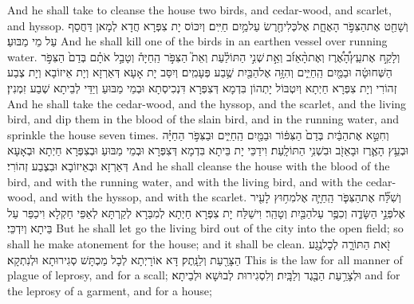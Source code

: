 {And he shall take to cleanse the house two birds, and cedar-wood, and scarlet, and hyssop.}{}
{וְשָׁחַ֖ט אֶת\maqqaf הַצִּפֹּ֣ר הָאֶחָ֑ת אֶל\maqqaf כְּלִי\maqqaf חֶ֖רֶשׂ עַל\maqqaf מַ֥יִם חַיִּֽים׃}
{וְיִכּוֹס יָת צִפְּרָא חֲדָא לְמָאן דַּחֲסַף עַל מֵי מַבּוּעַ׃}
{And he shall kill one of the birds in an earthen vessel over running water.}{}
{וְלָקַ֣ח אֶת\maqqaf עֵֽץ\maqqaf הָ֠אֶ֠רֶז וְאֶת\maqqaf הָ֨אֵזֹ֜ב וְאֵ֣ת \legarmeh  שְׁנִ֣י הַתּוֹלַ֗עַת וְאֵת֮ הַצִּפֹּ֣ר הַֽחַיָּה֒ וְטָבַ֣ל אֹתָ֗ם בְּדַם֙ הַצִּפֹּ֣ר הַשְּׁחוּטָ֔ה וּבַמַּ֖יִם הַֽחַיִּ֑ים וְהִזָּ֥ה אֶל\maqqaf הַבַּ֖יִת שֶׁ֥בַע פְּעָמִֽים׃}
{וְיִסַּב יָת אָעָא דְּאַרְזָא וְיָת אֵיזוֹבָא וְיָת צְבַע זְהוֹרִי וְיָת צִפְּרָא חַיְתָא וְיִטְבּוֹל יָתְהוֹן בִּדְמָא דְּצִפְּרָא דִּנְכִיסְתָא וּבְמֵי מַבּוּעַ וְיַדֵּי לְבֵיתָא שְׁבַע זִמְנִין׃}
{And he shall take the cedar-wood, and the hyssop, and the scarlet, and the living bird, and dip them in the blood of the slain bird, and in the running water, and sprinkle the house seven times.}{}
{וְחִטֵּ֣א אֶת\maqqaf הַבַּ֔יִת בְּדַם֙ הַצִּפּ֔וֹר וּבַמַּ֖יִם הַֽחַיִּ֑ים וּבַצִּפֹּ֣ר הַחַיָּ֗ה וּבְעֵ֥ץ הָאֶ֛רֶז וּבָאֵזֹ֖ב וּבִשְׁנִ֥י הַתּוֹלָֽעַת׃}
{וִידַכֵּי יָת בֵּיתָא בִּדְמָא דְּצִפְּרָא וּבְמֵי מַבּוּעַ וּבְצִפְּרָא חַיְתָא וּבְאָעָא דְּאַרְזָא וּבְאֵיזוֹבָא וּבִצְבַע זְהוֹרִי׃}
{And he shall cleanse the house with the blood of the bird, and with the running water, and with the living bird, and with the cedar-wood, and with the hyssop, and with the scarlet.}{}
{וְשִׁלַּ֞ח אֶת\maqqaf הַצִּפֹּ֧ר הַֽחַיָּ֛ה אֶל\maqqaf מִח֥וּץ לָעִ֖יר אֶל\maqqaf פְּנֵ֣י הַשָּׂדֶ֑ה וְכִפֶּ֥ר עַל\maqqaf הַבַּ֖יִת וְטָהֵֽר׃}
{וִישַׁלַּח יָת צִפְּרָא חַיְתָא לְמִבַּרָא לְקַרְתָּא לְאַפֵּי חַקְלָא וִיכַפַּר עַל בֵּיתָא וְיִדְכֵּי׃}
{But he shall let go the living bird out of the city into the open field; so shall he make atonement for the house; and it shall be clean.}{}
{זֹ֖את הַתּוֹרָ֑ה לְכׇל\maqqaf נֶ֥גַע הַצָּרַ֖עַת וְלַנָּֽתֶק׃}
{דָּא אוֹרָיְתָא לְכָל מַכְתָּשׁ סְגִירוּתָא וּלְנִתְקָא׃}
{This is the law for all manner of plague of leprosy, and for a scall;}{}
{וּלְצָרַ֥עַת הַבֶּ֖גֶד וְלַבָּֽיִת׃}
{וְלִסְגִירוּת לְבוּשָׁא וּלְבֵיתָא׃}
{and for the leprosy of a garment, and for a house;}{}
